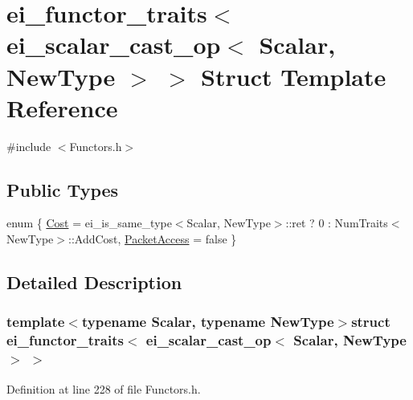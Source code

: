 \hypertarget{structei__functor__traits_3_01ei__scalar__cast__op_3_01_scalar_00_01_new_type_01_4_01_4}{\section{ei\-\_\-functor\-\_\-traits$<$ ei\-\_\-scalar\-\_\-cast\-\_\-op$<$ Scalar, New\-Type $>$ $>$ Struct Template Reference}
\label{structei__functor__traits_3_01ei__scalar__cast__op_3_01_scalar_00_01_new_type_01_4_01_4}
}


{\ttfamily \#include $<$Functors.\-h$>$}

\subsection*{Public Types}
\begin{DoxyCompactItemize}
\item 
enum \{ \hyperlink{structei__functor__traits_3_01ei__scalar__cast__op_3_01_scalar_00_01_new_type_01_4_01_4_a8563ba697d816930ad97e380395c8ccda9c1be94354c7a769531c31db117a264b}{Cost} = ei\-\_\-is\-\_\-same\-\_\-type$<$Scalar, New\-Type$>$\-:\-:ret ? 0 \-: Num\-Traits$<$New\-Type$>$\-:\-:Add\-Cost, 
\hyperlink{structei__functor__traits_3_01ei__scalar__cast__op_3_01_scalar_00_01_new_type_01_4_01_4_a8563ba697d816930ad97e380395c8ccda9deec4bfd8dfc720b13c404320772b59}{Packet\-Access} = false
 \}
\end{DoxyCompactItemize}


\subsection{Detailed Description}
\subsubsection*{template$<$typename Scalar, typename New\-Type$>$struct ei\-\_\-functor\-\_\-traits$<$ ei\-\_\-scalar\-\_\-cast\-\_\-op$<$ Scalar, New\-Type $>$ $>$}



Definition at line 228 of file Functors.\-h.



